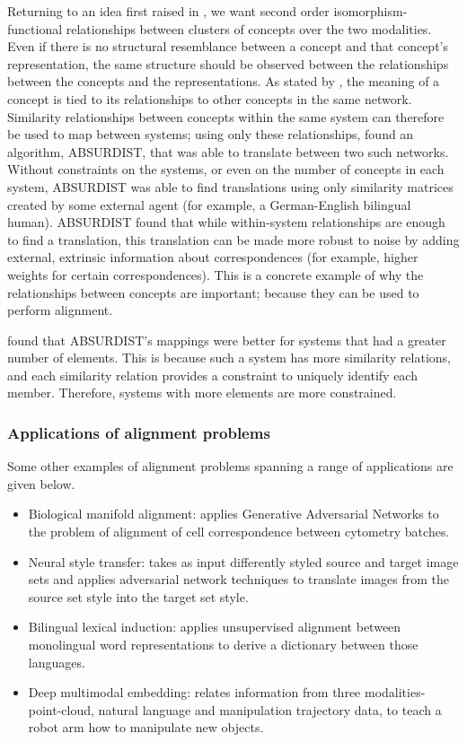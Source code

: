 Returning to an idea first raised in \cite{SHEPARD19701}, we want second order isomorphism- functional relationships between clusters of concepts over the two modalities. Even if there is no structural resemblance between a concept and that concept's representation, the same structure should be observed between the relationships between the concepts  and the representations. As stated by \cite{GOLDSTONE2002295}, the meaning of a concept is tied to its relationships to other concepts in the same network. Similarity relationships between concepts within the same system can therefore be used to map between systems; using only these relationships, \cite{GOLDSTONE2002295} found an algorithm, ABSURDIST, that was able to translate between two such networks. Without constraints on the systems, or even on the number of concepts in each system, ABSURDIST was able to find translations using only similarity matrices created by some external agent (for example, a German-English bilingual human). ABSURDIST found that while within-system relationships are enough to find a translation, this translation can be made more robust to noise by adding external, extrinsic information about correspondences (for example, higher weights for certain correspondences). This is a concrete example of why the relationships between concepts are important; because they can be used to perform alignment. 

\cite{GOLDSTONE2002295} found that ABSURDIST's mappings were better for systems that had a greater number of elements. This is because such a system has more similarity relations, and each similarity relation provides a constraint to uniquely identify each member. Therefore, systems with more elements are more constrained. 

\subsubsection{Applications of alignment problems}

Some other examples of alignment problems spanning a range of applications are given below.  

\begin{itemize}
    \item Biological manifold alignment: \cite{magan} applies Generative Adversarial Networks \cite{GAN} to the problem of alignment of cell correspondence between cytometry batches.
    \item Neural style transfer: \cite{CycleGAN} takes as input differently styled source and target image sets and applies adversarial network techniques to translate images from the source set style into the target set style. 
    \item Bilingual lexical induction: \cite{wordtranslationwithoutparalleldata} applies unsupervised alignment between monolingual word representations to derive a dictionary between those languages.
    \item Deep multimodal embedding: \cite{DeepMultimodalEmbedding} relates information from three modalities- point-cloud, natural language and manipulation trajectory data, to teach a robot arm  how to manipulate new objects. 
\end{itemize}

